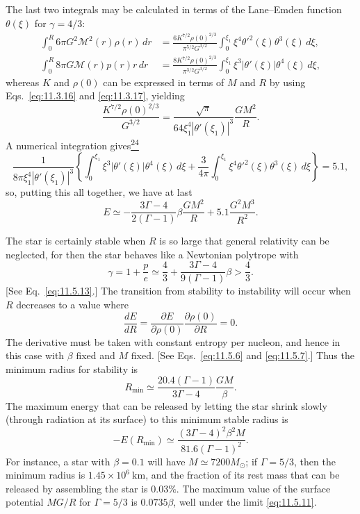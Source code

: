 The last two integrals may be calculated in terms of the Lane--Emden function
\(\theta(\xi)\) for \(\gamma=4/3\):
\[
  \begin{aligned}
  \int_0^R6\pi G^2\mathcal{M}^2(r)\rho(r)\,dr
  &=
  \frac{6K^{7/2}\rho(0)^{2/3}}{\pi^{5/2}G^{3/2}}
  \int_0^{\xi_1}\xi^4\theta'^2(\xi)\theta^3(\xi)\,d\xi,\\
  \int_0^R8\pi G\mathcal{M}(r)p(r)r\,dr
  &=
  \frac{8K^{7/2}\rho(0)^{2/3}}{\pi^{3/2}G^{3/2}}
  \int_0^{\xi_1}\xi^3|\theta'(\xi)|\theta^4(\xi)\,d\xi,
  \end{aligned}
\]
whereas \(K\) and \(\rho(0)\) can be expressed in terms of \(M\) and \(R\)
by using Eqs.~\eqref{eq:11.3.16} and \eqref{eq:11.3.17}, yielding
\[
  \frac{K^{7/2}\rho(0)^{2/3}}{G^{3/2}}
  =
  \frac{\sqrt\pi}{64\xi_1^4|\theta'(\xi_1)|^3}
  \frac{GM^2}{R}.
\]
A numerical integration
gives\hyperref[ch11-ref-24]{\textsuperscript{24}}
\[
  \frac1{8\pi\xi_1^4|\theta'(\xi_1)|^3}
  \left\{
    \int_0^{\xi_1}\xi^3|\theta'(\xi)|\theta^4(\xi)\,d\xi
    +\frac3{4\pi}
    \int_0^{\xi_1}\xi^4\theta'^2(\xi)\theta^3(\xi)\,d\xi
  \right\}
  =
  5.1,
\]
so, putting this all together, we have at last
\begin{equation}
  E
  \simeq
  -\frac{3\Gamma-4}{2(\Gamma-1)}
  \beta\frac{GM^2}{R}
  +5.1\frac{G^2M^3}{R^2}.
  \tag{11.5.16}\label{eq:11.5.16}
\end{equation}

The star is certainly stable when \(R\) is so large that general relativity
can be neglected, for then the star behaves like a Newtonian polytrope with
\[
  \gamma
  =
  1+\frac pe
  \simeq
  \frac43+\frac{3\Gamma-4}{9(\Gamma-1)}\beta
  >
  \frac43.
\]
[See Eq.~\eqref{eq:11.5.13}.] The transition from stability to instability
will occur when \(R\) decreases to a value where
\[
  \frac{dE}{dR}
  =
  \frac{\partial E}{\partial\rho(0)}
  \frac{\partial\rho(0)}{\partial R}
  =
  0.
\]
The derivative must be taken with constant entropy per nucleon, and hence in
this case with \(\beta\) fixed and \(M\) fixed. [See
Eqs.~\eqref{eq:11.5.6} and \eqref{eq:11.5.7}.] Thus the minimum radius for
stability is
\begin{equation}
  R_{\min}
  \simeq
  \frac{20.4(\Gamma-1)}{3\Gamma-4}\frac{GM}{\beta}.
  \tag{11.5.17}\label{eq:11.5.17}
\end{equation}
The maximum energy that can be released by letting the star shrink slowly
(through radiation at its surface) to this minimum stable radius is
\begin{equation}
  -E(R_{\min})
  \simeq
  \frac{(3\Gamma-4)^2\beta^2M}{81.6(\Gamma-1)^2}.
  \tag{11.5.18}\label{eq:11.5.18}
\end{equation}
For instance, a star with \(\beta=0.1\) will have
\(M\simeq7200M_\odot\); if \(\Gamma=5/3\), then the minimum radius is
\(1.45\times10^6\ \mathrm{km}\), and the fraction of its rest mass that can
be released by assembling the star is \(0.03\%\). The maximum value of the
surface potential \(MG/R\) for \(\Gamma=5/3\) is \(0.0735\beta\), well under
the limit \eqref{eq:11.5.11}.
